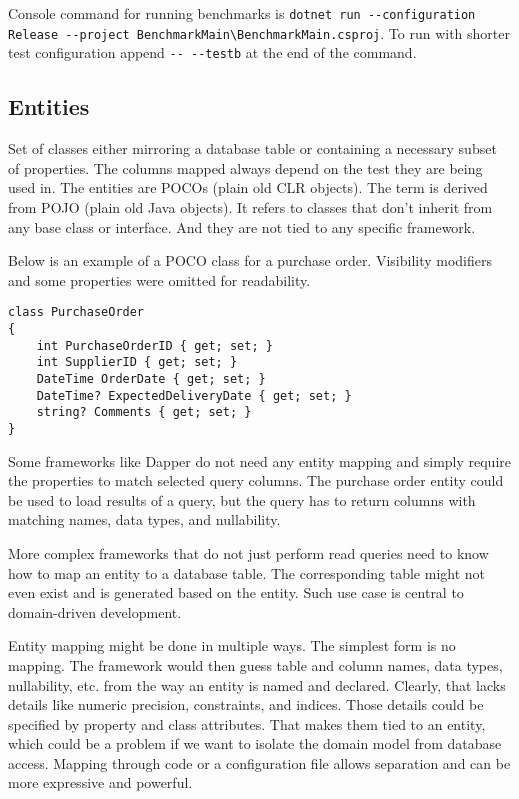 Console command for running benchmarks is \lstinline{dotnet run --configuration Release --project BenchmarkMain\BenchmarkMain.csproj}. To run with shorter test configuration append \lstinline{-- --testb} at the end of the command.


\subsection{Entities}
Set of classes either mirroring a database table or containing a necessary subset of properties. The columns mapped always depend on the test they are being used in. The entities are POCOs (plain old CLR objects). The term is derived from POJO (plain old Java objects). \cite{Fowler2003POJO} It refers to classes that don't inherit from any base class or interface. And they are not tied to any specific framework.

Below is an example of a POCO class for a purchase order. Visibility modifiers and some properties were omitted for readability. 


\begin{lstlisting}[language=CSharp]
class PurchaseOrder
{
    int PurchaseOrderID { get; set; }
    int SupplierID { get; set; }
    DateTime OrderDate { get; set; }
    DateTime? ExpectedDeliveryDate { get; set; }
    string? Comments { get; set; }
}
\end{lstlisting}

Some frameworks like Dapper do not need any entity mapping and simply require the properties to match selected query columns. The purchase order entity could be used to load results of a query, but the query has to return columns with matching names, data types, and nullability.

More complex frameworks that do not just perform read queries need to know how to map an entity to a database table. The corresponding table might not even exist and is generated based on the entity. Such use case is central to domain-driven development\cite{FowlerDDD}.

Entity mapping might be done in multiple ways. The simplest form is no mapping. The framework would then guess table and column names, data types, nullability, etc. from the way an entity is named and declared. Clearly, that lacks details like numeric precision, constraints, and indices.
Those details could be specified by property and class attributes. That makes them tied to an entity, which could be a problem if we want to isolate the domain model from database access. 
Mapping through code or a configuration file allows separation and can be more expressive and powerful.

